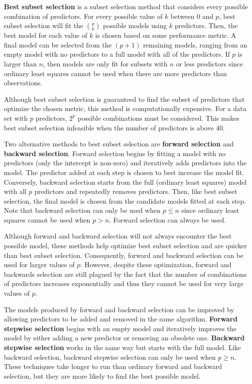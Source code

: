 \documentclass{article}
\begin{document}
\textbf{Best subset selection} is a subset selection method that considers every possible combination of predictors. For every possible value of $k$ between 0 and $p$, best subset selection will fit the ${p\choose k}$ possible models using $k$ predictors. Then, the best model for each value of $k$ is chosen based on some performance metric. A final model can be selected from the $(p + 1)$ remaining models, ranging from an empty model with no predictors to a full model with all of the predictors. If $p$ is larger than $n$, then models are only fit for subsets with $n$ or less predictors since ordinary least squares cannot be used when there are more predictors than observations.

Although best subset selection is guaranteed to find the subset of predictors that optimize the chosen metric, this method is computationally expensive. For a data set with $p$ predictors, $2^p$ possible combinations must be considered. This makes best subset selection infeasible when the number of predictors is above 40.

Two alternative methods to best subset selection are \textbf{forward selection} and \textbf{backward selection}. Forward selection begins by fitting a model with no predictors (only the intercept is non-zero) and iteratively adds predictors into the model. The predictor added at each step is chosen to best increase the model fit. Conversely, backward selection starts from the full (ordinary least squares) model with all $p$ predictors and repeatedly removes predictors. Then, like best subset selection, the final model is chosen from the candidate models fitted at each step. Note that backward selection can only be used when $p\leq n$ since ordinary least squares cannot be used when $p>n$. Forward selection can always be used.

Although forward and backward selection will not always encounter the best possible model, these methods help optimize best subset selection and are quicker than best subset selection. Consequently, forward and backward selection can be used for larger values of $p$. However, despite these optimization, forward and backwards selection are still plagued by the fact that the number of combinations of predictors increases exponentially and thus they cannot be used for very large values of $p$.

The models produced by forward and backward selection can be improved by allowing predictors to be added and removed in the same algorithm. \textbf{Forward stepwise selection} begins with an empty model and iteratively improves the model by either adding a new predictor or removing an obsolete one. \textbf{Backward stepwise selection} works in the same way but starts with the full model. Like backward selection, backward stepwise selection can only be used when $p\geq n$. These techniques take longer to run than ordinary forward and backward selection, but they are more likely to find the best possible model.
\end{document}
